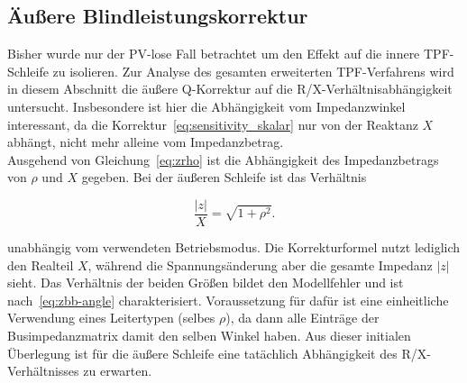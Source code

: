 
\subsection{Äußere Blindleistungskorrektur}
\label{subsec:rx_outer}

Bisher wurde nur der PV-lose Fall betrachtet um den Effekt auf die innere TPF-Schleife zu isolieren.
Zur Analyse des gesamten erweiterten TPF-Verfahrens wird in diesem Abschnitt die äußere Q-Korrektur auf die R/X-Verhältnisabhängigkeit untersucht.
Insbesondere ist hier die Abhängigkeit vom Impedanzwinkel interessant, da die Korrektur~\eqref{eq:sensitivity_skalar} nur von der Reaktanz $X$ abhängt, nicht mehr alleine vom Impedanzbetrag.\\

Ausgehend von Gleichung~\eqref{eq:zrho} ist die Abhängigkeit des Impedanzbetrags von $\rho$ und $X$ gegeben.
Bei der äußeren Schleife ist das Verhältnis 

\begin{equation}
	\frac{\lvert z\rvert}{X}=\sqrt{1+\rho^{2}}.
	\label{eq:zbb-angle}
\end{equation}

unabhängig vom verwendeten Betriebsmodus.
Die Korrekturformel nutzt lediglich den Realteil $X$, während die Spannungsänderung aber die gesamte Impedanz $\lvert z\rvert$ sieht.
Das Verhältnis der beiden Größen bildet den Modellfehler und ist nach~\eqref{eq:zbb-angle} charakterisiert.
Voraussetzung für dafür ist eine einheitliche Verwendung eines Leitertypen (selbes $\rho$), da dann alle Einträge der Busimpedanzmatrix damit den selben Winkel haben.
Aus dieser initialen Überlegung ist für die äußere Schleife eine tatächlich Abhängigkeit des R/X-Verhältnisses zu erwarten.\\

